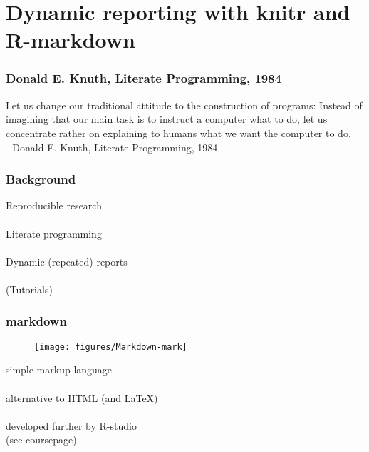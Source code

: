 \documentclass{beamer}
\begin{document}
\section{Dynamic reporting with knitr and R-markdown}

\begin{frame}
	\frametitle{Donald E. Knuth, Literate Programming, 1984}
Let us change our traditional attitude to the construction of programs: Instead 
of imagining that our main task is to instruct a computer what to do, let us 
concentrate rather on explaining to humans what we want the computer to do.\\
- Donald E. Knuth, Literate Programming, 1984
\end{frame}

\begin{frame}
	\frametitle{Background}
	\begin{center}
		Reproducible research \\~\\
		
		Literate programming \\~\\
		
		Dynamic (repeated) reports \\~\\
		
		(Tutorials)
	\end{center}
\end{frame}

\begin{frame}
	\frametitle{markdown}
	\begin{center}
		\begin{figure}[!ht]
			\texttt{[image: figures/Markdown-mark]}
			\label{fig:M}
		\end{figure}
	\end{center}
	\begin{center}
		simple markup language \\~\\
		
		alternative to HTML (and LaTeX) \\~\\
		
		developed further by R-studio  \\
		(see coursepage)
	\end{center}
\end{frame}
\end{document}
